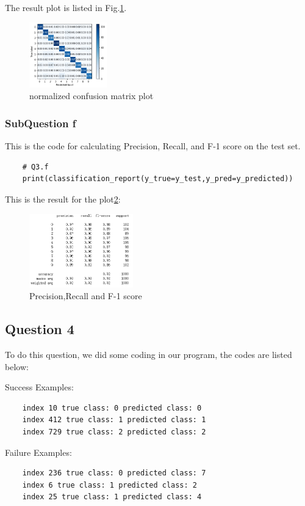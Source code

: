 \documentclass[conference]{IEEEtran}
\begin{document}
The result plot is listed in Fig.\ref{Fig.t1q3e}.
\begin{figure}[h] 
    \centering
    \includegraphics[width=0.3\textwidth]{T1Q3e.png}
    \caption{normalized confusion matrix plot}
    \label{Fig.t1q3e}
\end{figure}
\subsubsection{SubQuestion f}
This is the code for calculating Precision, Recall, and F-1 score on the test set.
\begin{lstlisting}
    # Q3.f
    print(classification_report(y_true=y_test,y_pred=y_predicted))
\end{lstlisting}
This is the result for the plot\ref{Fig.t1q3f}:
\begin{figure}[h] 
    \centering
    \includegraphics[width=0.4\textwidth]{T1Q3f.png}
    \caption{Precision,Recall and F-1 score}
    \label{Fig.t1q3f}
\end{figure}
\subsection{Question 4}
To do this question, we did some coding in our program, the codes are listed below:

Success Examples:
\begin{lstlisting}
    index 10 true class: 0 predicted class: 0
    index 412 true class: 1 predicted class: 1
    index 729 true class: 2 predicted class: 2
\end{lstlisting}
Failure Examples:
\begin{lstlisting}
    index 236 true class: 0 predicted class: 7
    index 6 true class: 1 predicted class: 2
    index 25 true class: 1 predicted class: 4
\end{lstlisting}
\end{document}
